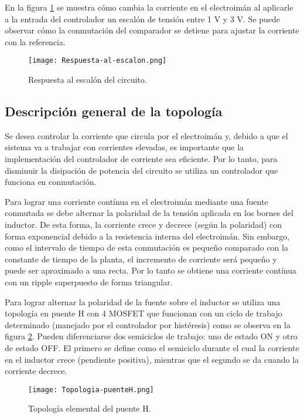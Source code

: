 \noindent En la figura \ref{fig:img_respuesta-al-escalon} se muestra cómo cambia la corriente en el electroimán al aplicarle a la entrada del controlador un escalón de tensión entre 1 V y 3 V. Se puede observar cómo la conmutación del comparador se detiene para ajustar la corriente con la referencia.

\begin{figure}[H]
	\centering
	\texttt{[image: Respuesta-al-escalon.png]}
	\caption{Respuesta al escalón del circuito.}
	\label{fig:img_respuesta-al-escalon}
\end{figure}


\subsection{Descripción general de la topología}

\noindent Se desea controlar la corriente que circula por el electroimán y, debido a que el sistema va a trabajar con corrientes elevadas, es importante que la implementación del controlador de corriente sea eficiente. Por lo tanto, para disminuir la disipación de potencia del circuito se utiliza un controlador que funciona en conmutación. 

\noindent Para lograr una corriente contínua en el electroimán mediante una fuente conmutada se debe alternar la polaridad de la tensión aplicada en los bornes del inductor. De esta forma, la corriente crece y decrece (según la polaridad) con forma exponencial debido a la resistencia interna del electroimán. Sin embargo, como el intervalo de tiempo de esta conmutación es pequeño comparado con la constante de tiempo de la planta, el incremento de corriente será pequeño y puede ser aproximado a una recta. Por lo tanto se obtiene una corriente contínua con un ripple superpuesto de forma triangular. 

\noindent Para lograr alternar la polaridad de la fuente sobre el inductor se utiliza una topología en puente H con 4 MOSFET que funcionan con un ciclo de trabajo determinado (manejado por el controlador por histéresis) como se observa en la figura \ref{fig:img_topologia-puenteH}. Pueden diferenciarse dos semiciclos de trabajo: uno de estado ON y otro de estado OFF. El primero se define como el semiciclo durante el cual la corriente en el inductor crece (pendiente positiva), mientras que el segundo se da cuando la corriente decrece.

\begin{figure}[H]
	\centering
	\texttt{[image: Topologia-puenteH.png]}
	\caption{Topología elemental del puente H.}
	\label{fig:img_topologia-puenteH}
\end{figure}

